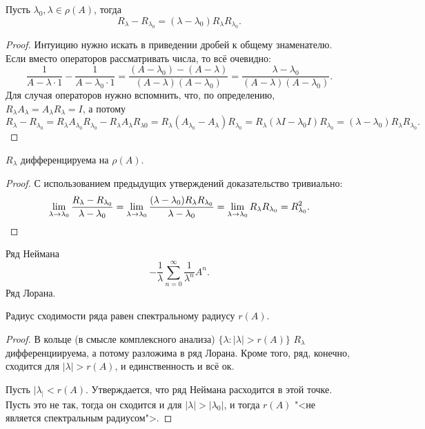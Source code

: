 \documentclass[main]{subfiles}
\begin{document}
\begin{proposition} %
  Пусть $\lambda_0, \lambda \in \rho(A)$, тогда
  \[
    R_\lambda - R_{\lambda_0} = (\lambda - \lambda_0)
    R_\lambda R_{\lambda_0}.
  \]
\end{proposition}
\begin{proof}
  Интуицию нужно искать в приведении дробей к общему знаменателю.
  Если вместо операторов рассматривать числа, то всё очевидно:
  \[
    \frac1{A - \lambda \cdot 1} - \frac{1}{A - \lambda_0 \cdot 1} =
    \frac{(A - \lambda_0) - (A - \lambda)}{(A - \lambda)(A - \lambda_0)} =
    \frac{\lambda - \lambda_0}{(A - \lambda)(A - \lambda_0)}.
  \]
  Для случая операторов нужно вспомнить, что, по определению,
  $R_\lambda A_\lambda = A_\lambda R_\lambda = I$,
  а потому
  \[ R_\lambda - R_{\lambda_0} = 
    R_\lambda A_{\lambda_0} R_{\lambda_0} -
    R_\lambda A_\lambda R_{\lambda 0} =
    R_\lambda (A_{\lambda_0} - A_\lambda) R_{\lambda_0} =
    R_\lambda (\lambda I - \lambda_0 I) R_{\lambda_0} =
    (\lambda - \lambda_0) R_\lambda R_{\lambda_0}.
  \]
\end{proof}

\begin{proposition} %
  $R_\lambda$ дифференцируема на $\rho(A)$.
\end{proposition}
\begin{proof}
  С использованием предыдущих утверждений доказательство тривиально:
  \[
    \lim_{\lambda \to \lambda_0}
    \frac{R_\lambda - R_{\lambda_0}}{\lambda - \lambda_0} =
    \lim_{\lambda \to \lambda_0}
    \frac{(\lambda - \lambda_0) R_\lambda R_{\lambda_0}}{\lambda - \lambda_0} =
    \lim_{\lambda \to \lambda_0} R_\lambda R_{\lambda_0} = R_{\lambda_0}^2.
    \qedhere
  \]
\end{proof}

Ряд Неймана
\[
  -\frac{1}{\lambda} \sum_{n=0}^\infty \frac{1}{\lambda^n} A^n.
\]
Ряд Лорана.

\begin{proposition} %
  Радиус сходимости ряда равен спектральному радиусу $r(A)$.
\end{proposition}
\begin{proof}
  В кольце (в смысле комплексного анализа)
  \( \{ \lambda : |\lambda| > r(A) \} \)
  \( R_\lambda \) дифференциируема, а потому разложима в ряд Лорана.
  Кроме того, ряд, конечно, сходится для $|\lambda| > r(A)$,
  и единственность и всё ок.
  
  Пусть $|\lambda_| < r(A)$. Утверждается, что ряд Неймана
  расходится в этой точке. Пусть это не так, тогда
  он сходится и для $|\lambda| > |\lambda_0|$,
  и тогда $r(A)$ "<не является спектральным радиусом">.
\end{proof}
\end{document}
